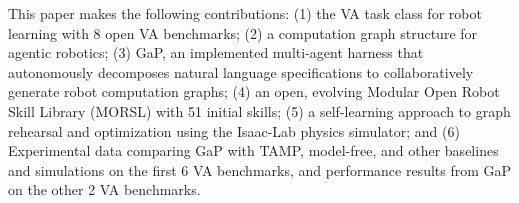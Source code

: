 This paper makes the following contributions:
(1) the VA task class for robot learning with 8 open VA benchmarks; (2)  a computation graph structure for agentic robotics; %
(3) GaP, an implemented multi-agent harness that autonomously decomposes natural language specifications to collaboratively generate robot computation graphs;
(4) an open, evolving Modular Open Robot Skill Library (MORSL) with 51 initial skills;
(5) a self-learning approach to graph rehearsal and optimization using the Isaac-Lab physics simulator; and
(6) Experimental data comparing GaP with TAMP, model-free, and other baselines and simulations on the first 6 VA benchmarks, and performance results from GaP on the other 2 VA benchmarks.




